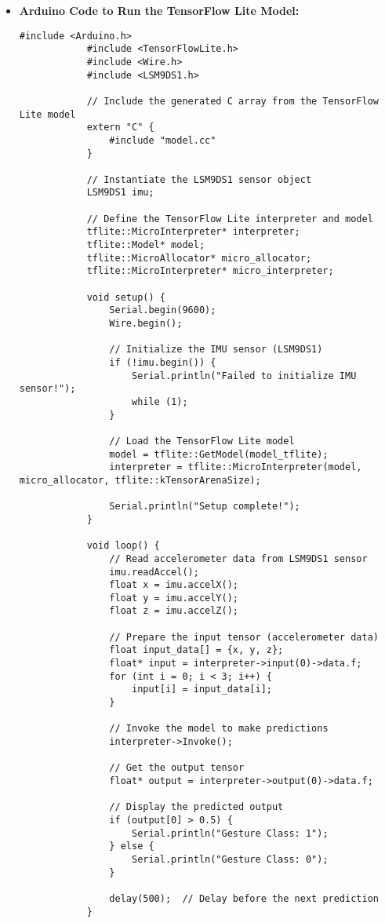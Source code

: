 	\begin{itemize}
		\item \textbf{Arduino Code to Run the TensorFlow Lite Model:}
		\begin{lstlisting}[caption={Arduino Code to Run the TensorFlow Lite Model}, label={code:arduino-tflite}, style=pythonstyle]
			#include <Arduino.h>
			#include <TensorFlowLite.h>
			#include <Wire.h>
			#include <LSM9DS1.h>
			
			// Include the generated C array from the TensorFlow Lite model
			extern "C" {
				#include "model.cc"
			}
			
			// Instantiate the LSM9DS1 sensor object
			LSM9DS1 imu;
			
			// Define the TensorFlow Lite interpreter and model
			tflite::MicroInterpreter* interpreter;
			tflite::Model* model;
			tflite::MicroAllocator* micro_allocator;
			tflite::MicroInterpreter* micro_interpreter;
			
			void setup() {
				Serial.begin(9600);
				Wire.begin();
				
				// Initialize the IMU sensor (LSM9DS1)
				if (!imu.begin()) {
					Serial.println("Failed to initialize IMU sensor!");
					while (1);
				}
				
				// Load the TensorFlow Lite model
				model = tflite::GetModel(model_tflite);
				interpreter = tflite::MicroInterpreter(model, micro_allocator, tflite::kTensorArenaSize);
				
				Serial.println("Setup complete!");
			}
			
			void loop() {
				// Read accelerometer data from LSM9DS1 sensor
				imu.readAccel();
				float x = imu.accelX();
				float y = imu.accelY();
				float z = imu.accelZ();
				
				// Prepare the input tensor (accelerometer data)
				float input_data[] = {x, y, z};
				float* input = interpreter->input(0)->data.f;
				for (int i = 0; i < 3; i++) {
					input[i] = input_data[i];
				}
				
				// Invoke the model to make predictions
				interpreter->Invoke();
				
				// Get the output tensor
				float* output = interpreter->output(0)->data.f;
				
				// Display the predicted output
				if (output[0] > 0.5) {
					Serial.println("Gesture Class: 1");
				} else {
					Serial.println("Gesture Class: 0");
				}
				
				delay(500);  // Delay before the next prediction
			}
		\end{lstlisting}
	\end{itemize}
	
